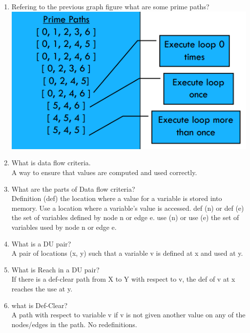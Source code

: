 \documentclass[10pt]{article}
\begin{document}
\begin{enumerate}
    \item Refering to the previous graph figure what are some prime paths?\\
          \includegraphics*[scale=.5]{primepaths.png}\\

    \item What is data flow criteria.\\
          A way to ensure that values are computed and used correctly.\\

    \item What are the parts of Data flow criteria?\\
          Definition (def) the location where a value for a variable is stored into memory. Use a location where a variable's value is accessed. def (n) or def (e) the set of variables defined by node n or edge e.
          use (n) or use (e) the set of variables used by node n or edge e.\\

    \item What is a DU pair?\\
          A pair of locations (x, y) such that a variable v is defined at x and used at y.\\

    \item What is Reach in a DU pair?\\
          If there is a def-clear path from X to Y with respect to v, the def of v at x reaches the use at y.\\

    \item what is Def-Clear?\\
          A path with respect to variable v if v is not given another value on any of the nodes/edges in the path. No redefinitions.\\


\end{enumerate}
\end{document}
